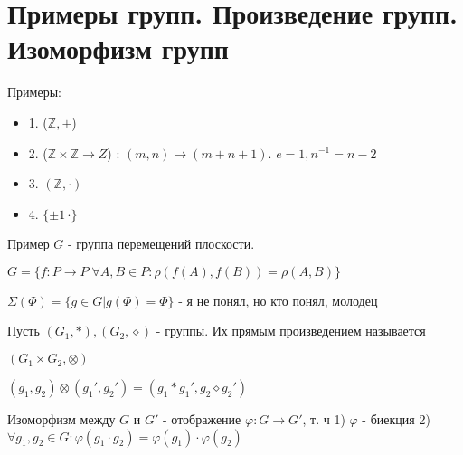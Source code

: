 \section{Примеры групп. Произведение групп. Изоморфизм групп}
Примеры:
\begin{itemize}
\item[] 1. ($\mathbb{Z}, +$)
\item[] 2. ($\mathbb{Z}\times \mathbb{Z} \to Z$) : $(m, n) \to (m+n+1)$. $e=1, n^{-1}=n-2$
\item[] 3. $(\mathbb{Z}, \cdot)$
\item[] 4. $\{\pm 1\, \cdot \}$
\end{itemize}

Пример $G$ - группа перемещений плоскости.

$G = \{f: P \to P | \forall A, B \in P : \rho (f(A), f(B)) = \rho(A, B)\}$

$\Sigma(\Phi) = \{g \in G | g(\Phi) = \Phi\}$ - я не понял, но кто понял, молодец

\begin{conj}
    Пусть $(G_1, *), (G_2, \diamond)$ - группы. Их прямым произведением называется
    
    $(G_1\times G_2, \otimes)$
    
    $(g_1, g_2)\otimes (g_1', g_2') = (g_1*g_1', g_2\diamond g_2')$
\end{conj}
\begin{conj}
    Изоморфизм между $G$ и $G'$ - отображение $\varphi : G \to G'$, т. ч
        1) $\varphi$ - биекция
        2) $\forall g_1, g_2 \in G : \varphi (g_1\cdot  g_2) = \varphi (g_1)\cdot \varphi(g_2)$
\end{conj}